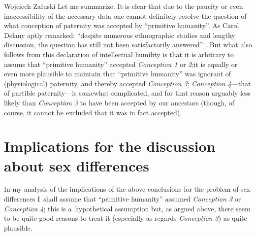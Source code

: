 \begin{artengenv}{Wojciech Załuski}
Let me summarize. It is clear that due to the paucity or even inaccessibility of the necessary data one cannot definitely resolve the question of what conception of paternity was accepted by ``primitive humanity''. As Carol Delany aptly remarked: ``despite numerous ethnographic studies and lengthy discussion, the question has still not been satisfactorily answered''
\parencite[][p.495]{delaney_meaning_1986}. %
 But what also follows from this declaration of intellectual humility is that it is arbitrary to assume that ``primitive humanity'' accepted \textit{Conception 1} or \textit{2};it is equally or even more plausible to maintain that ``primitive humanity'' was ignorant of (physiological) paternity, and thereby accepted \textit{Conception 3}; \textit{Conception 4}---that of partible paternity---is somewhat complicated, and for that reason arguably less likely than \textit{Conception 3} to have been accepted by our ancestors (though, of course, it cannot be excluded that it was in fact accepted).

\section{Implications for the discussion about sex differences}\label{zal:sec4}
In my analysis of the implications of the above conclusions for the problem of sex differences I~shall assume that ``primitive humanity'' assumed \textit{Conception 3} or \textit{Conception 4}; this is a~hypothetical assumption but, as argued above, there seem to be quite good reasons to treat it (especially as regards \textit{Conception 3}) as quite plausible.


\end{artengenv}
